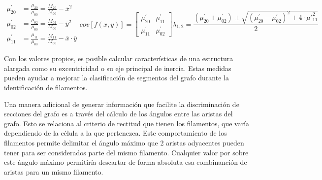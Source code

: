 \begin{subequations}
\begin{align}
    \mu_{20}^{\prime} &= \frac{\mu_{20}}{\mu_{00}} = \frac{M_{20}}{M_{00}} - \overline{x}^{2} \label{eq:mu20} \\
    \mu_{02}^{\prime} &= \frac{\mu_{02}}{\mu_{00}} = \frac{M_{02}}{M_{00}} - \overline{y}^{2} \label{eq:mu02} \\
    \mu_{11}^{\prime} &= \frac{\mu_{11}}{\mu_{00}} = \frac{M_{11}}{M_{00}} - \overline{x}\cdot\overline{y} \label{eq:mu11}
\end{align}

\begin{equation}
    \label{eq:covMatLambda}
    cov[f(x,y)] = \begin{bmatrix}
        \mu_{20}^{\prime} & \mu_{11}^{\prime} \\
        \mu_{11}^{\prime} & \mu_{02}^{\prime} 
        \end{bmatrix}
\end{equation}

\begin{equation}
    \label{eq:lambdaMoments}
    \lambda_{1,2} = \dfrac{(\mu_{20}^{\prime} + \mu_{02}^{\prime}) \pm \sqrt{(\mu_{20}^{\prime} - \mu_{02}^{\prime})^{2} + 4\cdot \mu\prime_{11}^{2} }}{2}
\end{equation}
\end{subequations}

Con los valores propios, es posible calcular caracter\'isticas de una estructura alargada como su excentricidad o su eje principal de inercia. Estas medidas pueden ayudar a mejorar la clasificaci\'on de segmentos del grafo durante la identificaci\'on de filamentos.


Una manera adicional de generar informaci\'on que facilite la discriminaci\'on de secciones del grafo es a trav\'es del c\'alculo de los \'angulos entre las aristas del grafo. Esto se relaciona al criterio de rectitud que tienen los filamentos, que var\'ia dependiendo de la c\'elula a la que pertenezca. Este comportamiento de los filamentos permite delimitar el \'angulo m\'aximo que 2 aristas adyacentes pueden tener para ser considerados parte del mismo filamento. Cualquier valor por sobre este \'angulo m\'aximo permitir\'ia descartar de forma absoluta esa combinanci\'on de aristas para un mismo filamento. 



